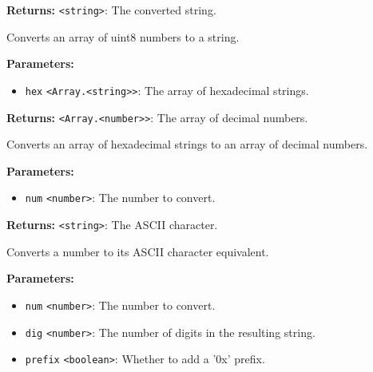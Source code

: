 \documentclass[12pt,a4paper]{article}
\begin{document}
\noindent \textbf{Returns:} \texttt{<string>}: The converted string.

\noindent Converts an array of uint8 numbers to a string.

\vspace{5mm}
\noindent {}


\noindent \textbf{Parameters:}
\begin{itemize}
  \item \texttt{hex} \texttt{<Array.<string>>}: The array of hexadecimal strings.
\end{itemize}

\noindent \textbf{Returns:} \texttt{<Array.<number>>}: The array of decimal numbers.

\noindent Converts an array of hexadecimal strings to an array of decimal numbers.

\vspace{5mm}
\noindent {}


\noindent \textbf{Parameters:}
\begin{itemize}
  \item \texttt{num} \texttt{<number>}: The number to convert.
\end{itemize}

\noindent \textbf{Returns:} \texttt{<string>}: The ASCII character.

\noindent Converts a number to its ASCII character equivalent.

\vspace{5mm}
\noindent {}


\noindent \textbf{Parameters:}
\begin{itemize}
  \item \texttt{num} \texttt{<number>}: The number to convert.
  \item \texttt{dig} \texttt{<number>}: The number of digits in the resulting string.
  \item \texttt{prefix} \texttt{<boolean>}: Whether to add a '0x' prefix.
\end{itemize}
\end{document}
